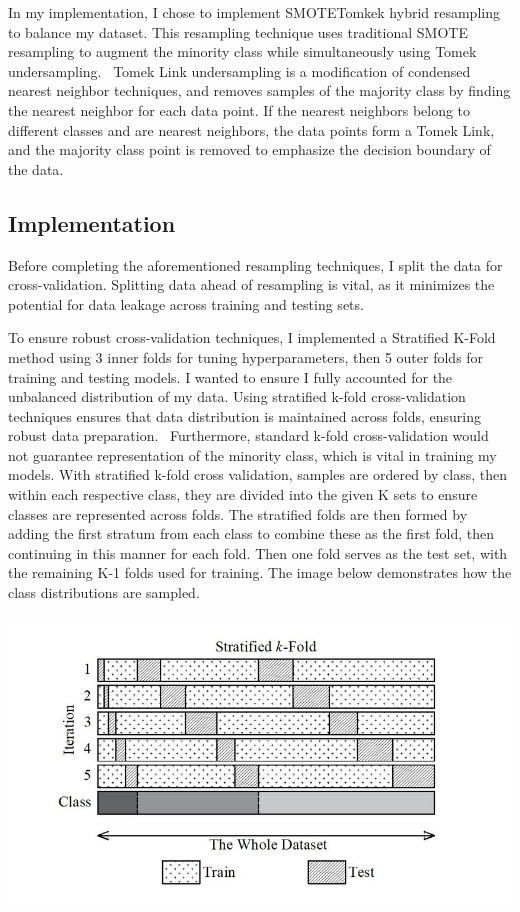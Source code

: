 \documentclass{article}
\begin{document}
In my implementation, I chose to implement SMOTETomkek hybrid resampling to balance my dataset. This resampling technique uses traditional SMOTE resampling to augment the minority class while simultaneously using Tomek undersampling.~\cite{tomek} Tomek Link undersampling is a modification of condensed nearest neighbor techniques, and removes samples of the majority class by finding the nearest neighbor for each data point. If the nearest neighbors belong to different classes and are nearest neighbors, the data points form a Tomek Link, and the majority class point is removed to emphasize the decision boundary of the data. 

\subsection{Implementation}

Before completing the aforementioned resampling techniques, I split the data for cross-validation. Splitting data ahead of resampling is vital, as it minimizes the potential for data leakage across training and testing sets. 

To ensure robust cross-validation techniques, I implemented a Stratified K-Fold method using 3 inner folds for tuning hyperparameters, then 5 outer folds for training and testing models. I wanted to ensure I fully accounted for the unbalanced distribution of my data. Using stratified k-fold cross-validation techniques ensures that data distribution is maintained across folds, ensuring robust data preparation.~\cite{Prusty2022} Furthermore, standard k-fold cross-validation would not guarantee representation of the minority class, which is vital in training my models. With stratified k-fold cross validation, samples are ordered by class, then within each respective class, they are divided into the given K sets to ensure classes are represented across folds. The stratified folds are then formed by adding the first stratum from each class to combine these as the first fold, then continuing in this manner for each fold. Then one fold serves as the test set, with the remaining K-1 folds used for training. The image below demonstrates how the class distributions are sampled. 

\begin{center}
    \includegraphics[scale = .60]{images/skf.jpeg}
~\cite{SKFIMAGE}
\end{center}
\end{document}
